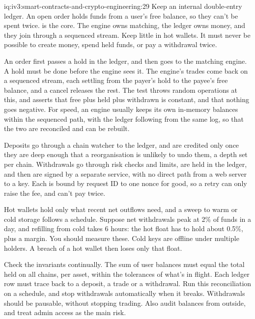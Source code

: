\begin{solution}{iq:iv3:smart-contracts-and-crypto-engineering:29}
Keep an internal double-entry ledger. An open order holds funds from a user's free balance, so they can't be spent twice.  is the core. The engine owns matching, the ledger owns money, and they join through a sequenced stream. Keep little in hot wallets. It must never be possible to create money, spend held funds, or pay a withdrawal twice.
\label{lst:iv3:cr:holds}

An order first passes a hold in the ledger, and then goes to the matching engine. A hold must be done before the engine sees it. The engine's trades come back on a sequenced stream, each settling from the payer's hold to the payee's free balance, and a cancel releases the rest. The test throws random operations at this, and asserts that free plus held plus withdrawn is constant, and that nothing goes negative. For speed, an engine usually keeps its own in-memory balances within the sequenced path, with the ledger following from the same log, so that the two are reconciled and can be rebuilt.

Deposits go through a chain watcher to the ledger, and are credited only once they are deep enough that a reorganisation is unlikely to undo them, a depth set per chain. Withdrawals go through risk checks and limits, are held in the ledger, and then are signed by a separate service, with no direct path from a web server to a key. Each is bound by request ID to one nonce for good, so a retry can only raise the fee, and can't pay twice.

Hot wallets hold only what recent net outflows need, and a sweep to warm or cold storage follows a schedule. Suppose net withdrawals peak at 2\% of funds in a day, and refilling from cold takes 6 hours: the hot float has to hold about 0.5\%, plus a margin. You should measure these. Cold keys are offline under multiple holders. A breach of a hot wallet then loses only that float.

Check the invariants continually. The sum of user balances must equal the total held on all chains, per asset, within the tolerances of what's in flight. Each ledger row must trace back to a deposit, a trade or a withdrawal. Run this reconciliation on a schedule, and stop withdrawals automatically when it breaks. Withdrawals should be pausable, without stopping trading. Also audit balances from outside, and treat admin access as the main risk.

\end{solution}

